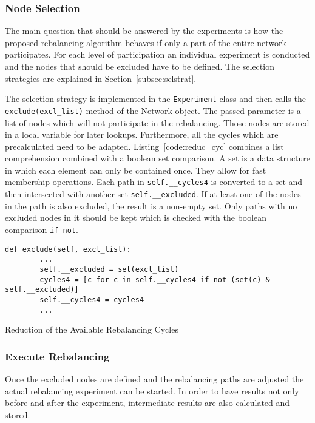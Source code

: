 \documentclass[final]{fhnwreport}       %
\begin{document}
\subsubsection{Node Selection}
The main question that should be answered by the experiments is how the proposed rebalancing algorithm behaves if only a part of the entire network participates. For each level of participation an individual experiment is conducted and the nodes that should be excluded have to be defined. The selection strategies are explained in Section~\ref{subsec:selstrat}.

The selection strategy is implemented in the \texttt{Experiment} class and then calls the \texttt{exclude(excl_list)} method of the Network object. The passed parameter is a list of nodes which will not participate in the rebalancing. Those nodes are stored in a local variable for later lookups. Furthermore, all the cycles which are precalculated need to be adapted. Listing~\ref{code:reduc_cyc} combines a list comprehension combined with a boolean set comparison. A set is a data structure in which each element can only be contained once. They allow for fast membership operations. Each path in \texttt{self.__cycles4} is converted to a set and then intersected with another set \texttt{self.__excluded}. If at least one of the nodes in the path is also excluded, the result is a non-empty set. Only paths with no excluded nodes in it should be kept which is checked with the boolean comparison \texttt{if not}.  

\begin{listing}[H]
  \begin{verbatim}
def exclude(self, excl_list):
        ...
        self.__excluded = set(excl_list)
        cycles4 = [c for c in self.__cycles4 if not (set(c) & self.__excluded)]
        self.__cycles4 = cycles4
        ...
  \end{verbatim}
  \caption{Reduction of the Available Rebalancing Cycles}
  \label{code:reduc_cyc}
\end{listing}


\subsubsection{Execute Rebalancing}
Once the excluded nodes are defined and the rebalancing paths are adjusted the actual rebalancing experiment can be started. In order to have results not only before and after the experiment, intermediate results are also calculated and stored. 
\end{document}
